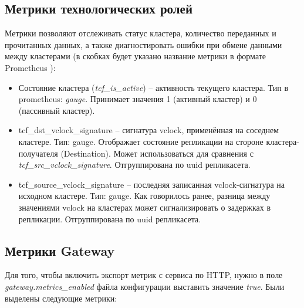 \subsection{Метрики технологических ролей}

Метрики позволяют отслеживать статус кластера, количество переданных и прочитанных данных, а также
диагностировать ошибки при обмене данными между кластерами (в скобках будет указано название метрики в
формате Prometheus \cite{prometheus}):

\begin{itemize}
  \item Состояние кластера (\textit{tcf\_is\_active}) -- активность текущего кластера.
  Тип в prometheus: \textit{gauge}. Принимает значения 1 (активный кластер) и 0 (пассивный кластер).
  \item tcf\_dst\_vclock\_signature -- сигнатура vclock, применённая на соседнем кластере.
  Тип: gauge. Отображает состояние репликации на стороне кластера-получателя (Destination). Может
  использоваться для сравнения с \textit{tcf\_src\_vclock\_signature}. Отгруппирована по uuid репликасета.
  \item tcf\_source\_vclock\_signature -- последняя записанная
  vclock-сигнатура на исходном кластере. Тип: gauge. Как говорилось ранее, разница между значениями vclock
  на кластерах может сигнализировать о задержках в репликации. Отгруппирована по uuid репликасета.
\end{itemize}

\subsection{Метрики Gateway}

Для того, чтобы включить экспорт метрик с сервиса по HTTP, нужно в поле \textit{gateway.metrics\_enabled}
файла конфигурации выставить значение \textit{true}. Были выделены следующие метрики:

